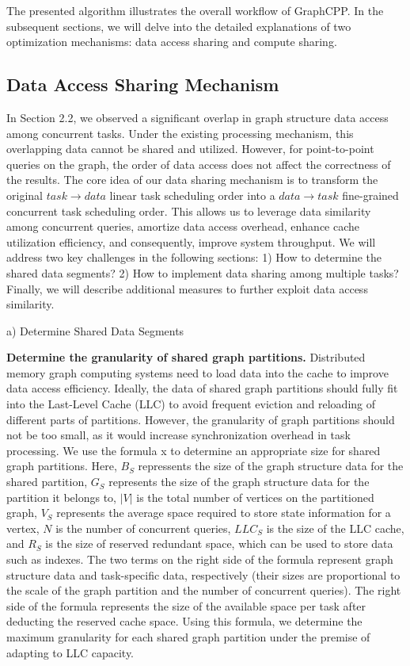 \documentclass[lettersize,journal]{IEEEtran} %
\begin{document}
The presented algorithm illustrates the overall workflow of GraphCPP. In the subsequent sections, we will delve into the detailed explanations of two optimization mechanisms: data access sharing and compute sharing.

\subsection{Data Access Sharing Mechanism}
In Section 2.2, we observed a significant overlap in graph structure data access among concurrent tasks. Under the existing processing mechanism, this overlapping data cannot be shared and utilized. However, for point-to-point queries on the graph, the order of data access does not affect the correctness of the results. The core idea of our data sharing mechanism is to transform the original $task \rightarrow data$ linear task scheduling order into a $data \rightarrow task$ fine-grained concurrent task scheduling order. This allows us to leverage data similarity among concurrent queries, amortize data access overhead, enhance cache utilization efficiency, and consequently, improve system throughput. We will address two key challenges in the following sections: 1) How to determine the shared data segments? 2) How to implement data sharing among multiple tasks? Finally, we will describe additional measures to further exploit data access similarity.

a) Determine Shared Data Segments

{\bf{Determine the granularity of shared graph partitions.}} Distributed memory graph computing systems need to load data into the cache to improve data access efficiency. Ideally, the data of shared graph partitions should fully fit into the Last-Level Cache (LLC) to avoid frequent eviction and reloading of different parts of partitions. However, the granularity of graph partitions should not be too small, as it would increase synchronization overhead in task processing. We use the formula x to determine an appropriate size for shared graph partitions. Here, $B_S$ repressents the size of the graph structure data for the shared partition, $G_S$ represents the size of the graph structure data for the partition it belongs to, $|V|$ is the total number of vertices on the partitioned graph, $V_S$ represents the average space required to store state information for a vertex, $N$ is the number of concurrent queries, $LLC_S$ is the size of the LLC cache, and $R_S$ is the size of reserved redundant space,  which can be used to store data such as indexes. The two terms on the right side of the formula represent graph structure data and task-specific data, respectively (their sizes are proportional to the scale of the graph partition and the number of concurrent queries). The right side of the formula represents the size of the available space per task after deducting the reserved cache space. Using this formula, we determine the maximum granularity for each shared graph partition under the premise of adapting to LLC capacity.
\end{document}
